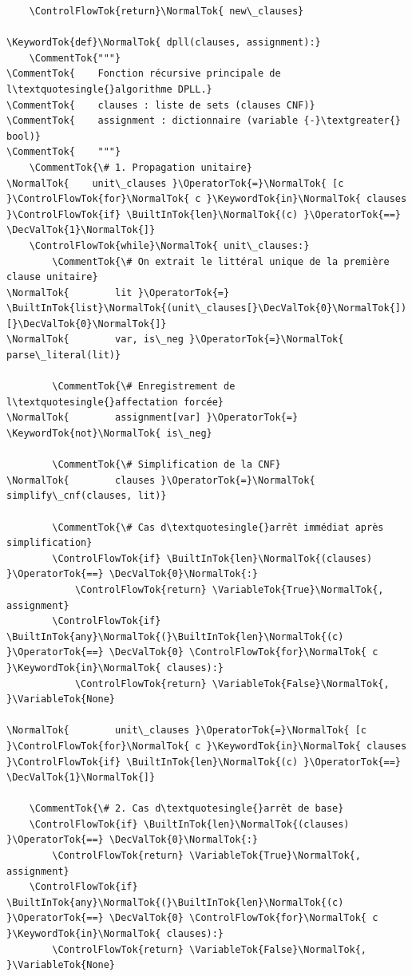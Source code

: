 \documentclass[11pt,a4paper]{article}
\begin{document}
\begin{lstlisting}
    \ControlFlowTok{return}\NormalTok{ new\_clauses}

\KeywordTok{def}\NormalTok{ dpll(clauses, assignment):}
    \CommentTok{"""}
\CommentTok{    Fonction récursive principale de l\textquotesingle{}algorithme DPLL.}
\CommentTok{    clauses : liste de sets (clauses CNF)}
\CommentTok{    assignment : dictionnaire (variable {-}\textgreater{} bool)}
\CommentTok{    """}
    \CommentTok{\# 1. Propagation unitaire}
\NormalTok{    unit\_clauses }\OperatorTok{=}\NormalTok{ [c }\ControlFlowTok{for}\NormalTok{ c }\KeywordTok{in}\NormalTok{ clauses }\ControlFlowTok{if} \BuiltInTok{len}\NormalTok{(c) }\OperatorTok{==} \DecValTok{1}\NormalTok{]}
    \ControlFlowTok{while}\NormalTok{ unit\_clauses:}
        \CommentTok{\# On extrait le littéral unique de la première clause unitaire}
\NormalTok{        lit }\OperatorTok{=} \BuiltInTok{list}\NormalTok{(unit\_clauses[}\DecValTok{0}\NormalTok{])[}\DecValTok{0}\NormalTok{]}
\NormalTok{        var, is\_neg }\OperatorTok{=}\NormalTok{ parse\_literal(lit)}

        \CommentTok{\# Enregistrement de l\textquotesingle{}affectation forcée}
\NormalTok{        assignment[var] }\OperatorTok{=} \KeywordTok{not}\NormalTok{ is\_neg}

        \CommentTok{\# Simplification de la CNF}
\NormalTok{        clauses }\OperatorTok{=}\NormalTok{ simplify\_cnf(clauses, lit)}

        \CommentTok{\# Cas d\textquotesingle{}arrêt immédiat après simplification}
        \ControlFlowTok{if} \BuiltInTok{len}\NormalTok{(clauses) }\OperatorTok{==} \DecValTok{0}\NormalTok{:}
            \ControlFlowTok{return} \VariableTok{True}\NormalTok{, assignment}
        \ControlFlowTok{if} \BuiltInTok{any}\NormalTok{(}\BuiltInTok{len}\NormalTok{(c) }\OperatorTok{==} \DecValTok{0} \ControlFlowTok{for}\NormalTok{ c }\KeywordTok{in}\NormalTok{ clauses):}
            \ControlFlowTok{return} \VariableTok{False}\NormalTok{, }\VariableTok{None}

\NormalTok{        unit\_clauses }\OperatorTok{=}\NormalTok{ [c }\ControlFlowTok{for}\NormalTok{ c }\KeywordTok{in}\NormalTok{ clauses }\ControlFlowTok{if} \BuiltInTok{len}\NormalTok{(c) }\OperatorTok{==} \DecValTok{1}\NormalTok{]}

    \CommentTok{\# 2. Cas d\textquotesingle{}arrêt de base}
    \ControlFlowTok{if} \BuiltInTok{len}\NormalTok{(clauses) }\OperatorTok{==} \DecValTok{0}\NormalTok{:}
        \ControlFlowTok{return} \VariableTok{True}\NormalTok{, assignment}
    \ControlFlowTok{if} \BuiltInTok{any}\NormalTok{(}\BuiltInTok{len}\NormalTok{(c) }\OperatorTok{==} \DecValTok{0} \ControlFlowTok{for}\NormalTok{ c }\KeywordTok{in}\NormalTok{ clauses):}
        \ControlFlowTok{return} \VariableTok{False}\NormalTok{, }\VariableTok{None}


\end{lstlisting}
\end{document}

